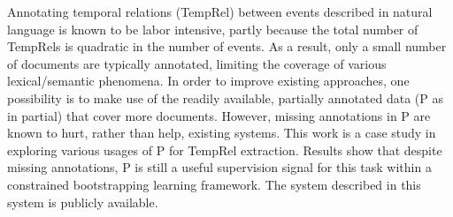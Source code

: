 Annotating temporal relations (TempRel) between events described in natural language is known to be labor intensive, partly because the total number of TempRels is quadratic in the number of events. As a result, only a small number of documents are typically annotated, limiting the coverage of various lexical/semantic phenomena. In order to improve existing approaches, one possibility is to make use of the readily available, partially annotated data (P as in partial) that cover more documents. However, missing annotations in P are known to hurt, rather than help, existing systems. This work is a case study in exploring various usages of P for TempRel extraction. Results show that despite missing annotations, P is still a useful supervision signal for this task within a constrained bootstrapping learning framework. The system described in this system is publicly available.
